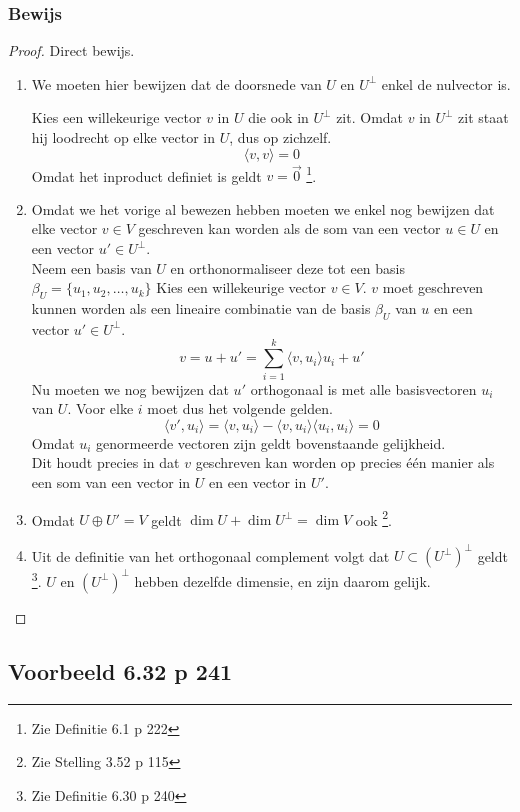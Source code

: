 \documentclass[lineaire_algebra_oplossingen.tex]{subfiles}
\begin{document}
\subsubsection*{Bewijs}
\begin{proof}
Direct bewijs.
\begin{enumerate}
\item
We moeten hier bewijzen dat de doorsnede van $U$ en $U^\bot$ enkel de nulvector is.

Kies een willekeurige vector $v$ in $U$ die ook in $U^\bot$ zit. Omdat $v$ in $U^\bot$ zit staat hij loodrecht op elke vector in $U$, dus op zichzelf.
\[
\langle v,v \rangle = 0
\]
Omdat het inproduct definiet is geldt $v=\vec{0}$ \footnote{Zie Definitie 6.1 p 222}.

\item
Omdat we het vorige al bewezen hebben moeten we enkel nog bewijzen dat elke vector $v\in V$ geschreven kan worden als de som van een vector $u \in U$ en een vector $u'\in U^\bot$.\\
Neem een basis van $U$ en orthonormaliseer deze tot een basis $\beta_U = \{u_1,u_2,\ldots,u_k\}$
Kies een willekeurige vector $v\in V$. $v$ moet geschreven kunnen worden als een lineaire combinatie van de basis $\beta_U$ van $u$ en een vector $u' \in U^\bot$.
\[
v = u + u' = \sum_{i=1}^k\langle v,u_i\rangle u_i + u'
\]
Nu moeten we nog bewijzen dat $u'$ orthogonaal is met alle basisvectoren $u_i$ van $U$. Voor elke $i$ moet dus het volgende gelden.
\[
\langle v',u_i \rangle = \langle v,u_i\rangle - \langle v,u_i\rangle\langle u_i,u_i\rangle = 0
\]
Omdat $u_i$ genormeerde vectoren zijn geldt bovenstaande gelijkheid.\\
Dit houdt precies in dat $v$ geschreven kan worden op precies \'e\'en manier als een som van een vector in $U$ en een vector in $U'$.

\item
Omdat $U \oplus U' = V$ geldt $\dim U+\dim U^\bot = \dim V$ ook \footnote{Zie Stelling 3.52 p 115}.

\item
Uit de definitie van het orthogonaal complement volgt dat $U \subset (U^\bot)^\bot$ geldt \footnote{Zie Definitie 6.30 p 240}. $U$ en $(U^\bot)^\bot$ hebben dezelfde dimensie, en zijn daarom gelijk. 
\end{enumerate}
\end{proof}


\subsection{Voorbeeld 6.32 p 241}
\label{6.32}
\end{document}
